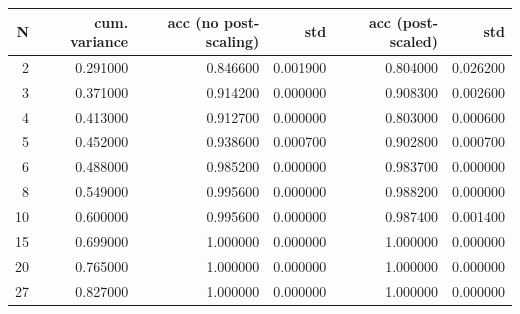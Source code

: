 \begin{tabular}{rrrrrr}
\toprule
N & cum. variance & acc (no post-scaling) & std & acc (post-scaled) & std  \\
\midrule
2 & 0.291000 & 0.846600 & 0.001900 & 0.804000 & 0.026200 \\
3 & 0.371000 & 0.914200 & 0.000000 & 0.908300 & 0.002600 \\
4 & 0.413000 & 0.912700 & 0.000000 & 0.803000 & 0.000600 \\
5 & 0.452000 & 0.938600 & 0.000700 & 0.902800 & 0.000700 \\
6 & 0.488000 & 0.985200 & 0.000000 & 0.983700 & 0.000000 \\
8 & 0.549000 & 0.995600 & 0.000000 & 0.988200 & 0.000000 \\
10 & 0.600000 & 0.995600 & 0.000000 & 0.987400 & 0.001400 \\
15 & 0.699000 & 1.000000 & 0.000000 & 1.000000 & 0.000000 \\
20 & 0.765000 & 1.000000 & 0.000000 & 1.000000 & 0.000000 \\
27 & 0.827000 & 1.000000 & 0.000000 & 1.000000 & 0.000000 \\
\bottomrule
\end{tabular}
